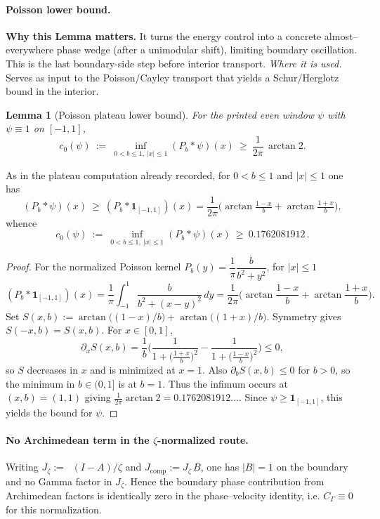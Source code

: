 \documentclass[11pt]{article}
\newtheorem{lemma}{Lemma}[section]
\theoremstyle{definition}
\theoremstyle{remark}
\newcommand{\Poisson}{P}
\DeclareMathOperator{\dettwo}{det_2}
\begin{document}
\vspace{1.0cm}
\paragraph{Poisson lower bound.}

\vspace{1.0cm}
\noindent\textbf{Why this Lemma matters.} It turns the energy control into a concrete almost--everywhere phase wedge (after a unimodular shift), limiting boundary oscillation. This is the last boundary-side step before interior transport.
\noindent\textit{Where it is used.} Serves as input to the Poisson/Cayley transport that yields a Schur/Herglotz bound in the interior.
\begin{lemma}[Poisson plateau lower bound]
\label{lem:poisson-plateau}
For the printed even window \(\psi\) with \(\psi\equiv 1\) on \([-1,1]\),
\[ c_0(\psi)\ :=\ \inf_{0<b\le 1,\ |x|\le 1} (\Poisson_b*\psi)(x)\ \ge\ \frac{1}{2\pi}\,\arctan 2. \]
\end{lemma}
As in the plateau computation already recorded, for \(0<b\le 1\) and \(|x|\le 1\) one has
\[
 (\Poisson_b*\psi)(x)\ \ge\ (\Poisson_b*\mathbf 1_{[-1,1]})(x)
  = \frac{1}{2\pi}\Big(\arctan\tfrac{1-x}{b}+\arctan\tfrac{1+x}{b}\Big),
\]
whence
\[
 c_0(\psi)\ :=\ \inf_{0<b\le 1,\ |x|\le 1} (\Poisson_b*\psi)(x)\ \ge\ 0.1762081912\,.
\]
\begin{proof}
For the normalized Poisson kernel \(P_b(y)=\dfrac{1}{\pi}\dfrac{b}{b^2+y^2}\), for \(|x|\le 1\)
\[
 (P_b*\mathbf 1_{[-1,1]})(x)=\frac{1}{\pi}\int_{-1}^{1}\frac{b}{b^2+(x-y)^2}\,dy=\frac{1}{2\pi}\Big(\arctan\frac{1-x}{b}+\arctan\frac{1+x}{b}\Big).
\]
Set \(S(x,b):=\arctan\big((1-x)/b\big)+\arctan\big((1+x)/b\big)\). Symmetry gives \(S(-x,b)=S(x,b)\). For \(x\in[0,1]\),
\[
 \partial_x S(x,b)=\frac{1}{b}\Big(\frac{1}{1+\big(\tfrac{1+x}{b}\big)^2}-\frac{1}{1+\big(\tfrac{1-x}{b}\big)^2}\Big)\le 0,
\]
so \(S\) decreases in \(x\) and is minimized at \(x=1\). Also \(\partial_b S(x,b)\le 0\) for \(b>0\), so the minimum in \(b\in(0,1]\) is at \(b=1\). Thus the infimum occurs at \((x,b)=(1,1)\) giving \(\frac{1}{2\pi}\arctan 2=0.1762081912\ldots\). Since \(\psi\ge \mathbf 1_{[-1,1]}\), this yields the bound for \(\psi\).
\end{proof}






\vspace{1.0cm}
\paragraph{No Archimedean term in the \(\zeta\)-normalized route.}
Writing \(J_\zeta:=\dettwo(I-A)/\zeta\) and \(J_{\mathrm{comp}}:=J_\zeta\,B\), one has \(|B|=1\) on the boundary and no Gamma factor in \(J_\zeta\). Hence the boundary phase contribution from Archimedean factors is identically zero in the phase–velocity identity, i.e. \(C_\Gamma\equiv 0\) for this normalization.
\end{document}
